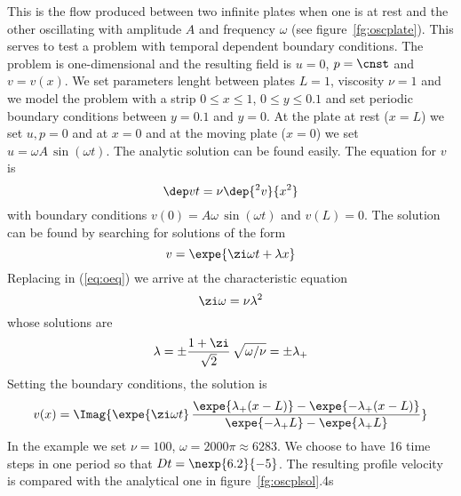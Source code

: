 This is the flow produced between two infinite plates when one is at
rest and the other oscillating with amplitude $A$ and frequency
$\omega$ (see figure~\ref{fg:oscplate}).  This serves to test a
problem with temporal dependent boundary conditions.  The problem is
one-dimensional and the resulting field is $u=0$, $p=\cnst$ and
$v=v(x)$. We set parameters lenght between plates $L=1$, viscosity
$\nu=1$ and we model the problem with a strip $0\le x \le 1$, $0\le y
\le 0.1$ and set periodic boundary conditions between $y=0.1$ and
$y=0$. At the plate at rest ($x=L$) we set $u,p=0$ and at $x=0$ and at
the moving plate ($x=0$) we set $u=\omega A \, \sin(\omega
t)$. The analytic solution can be found easily.  The
equation for $v$ is
%
\begin{equation}\label{eq:oeq}  
  \dep vt = \nu \dep {^2v}{x^2}
\end{equation}
%
with boundary conditions $v(0)=A\omega \, \sin(\omega t)$ and
$v(L)=0$. The solution can be found by searching for solutions of the
form
%
\begin{equation} 
   v = \expe{\zi\omega t+\lambda x}
\end{equation}
%
Replacing in (\ref{eq:oeq}) we arrive at the characteristic equation
%
\begin{equation} 
   \zi\omega  = \nu\lambda^2 
\end{equation}
%
whose solutions are
%
\begin{equation} 
    \lambda = \pm \frac{1+\zi}{\sqrt2} \, \sqrt{\omega/\nu} = \pm \lambda_+
\end{equation}
%
Setting the boundary conditions, the solution is
%
\begin{equation} 
   v(x) = \Imag{\expe{\zi\omega t} \, 
       \frac{ \expe{\lambda_+(x-L)} - \expe{-\lambda_+(x-L)}}
            { \expe{-\lambda_+L} - \expe{\lambda_+L}}}
\end{equation}
%
In the example we set $\nu=100$, $\omega=2000\pi\approx 6283$. We
choose to have 16 time steps in one period so that $Dt =
\nexp{6.2}{-5}$. The resulting profile velocity is compared with the
analytical one in figure~\ref{fg:oscplsol}.4s

\begin{figure*}[htb]
\caption{Oscillating plates.}
\label{fg:oscplate}
\end{figure*}
 
\begin{figure*}[htb]
\caption{Velocity profile for the oscilating plate problem.}
\label{fg:oscplsol}
\end{figure*}

